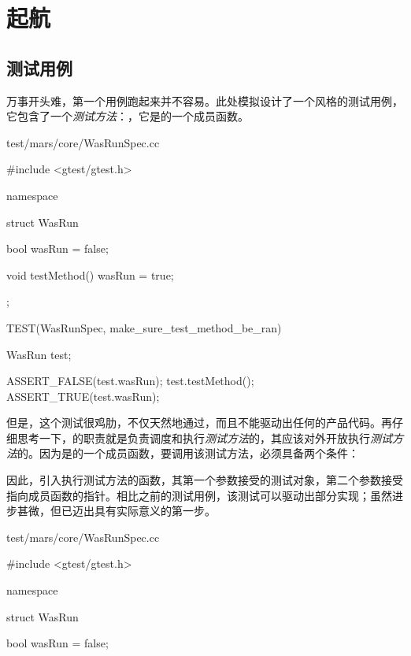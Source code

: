 \section{起航}

\begin{content}

\subsection{测试用例}

万事开头难，第一个用例跑起来并不容易。此处模拟设计了一个风格的测试用例，它包含了一个\emph{测试方法}：，它是的一个成员函数。

\begin{nodiff}{test/mars/core/WasRunSpec.cc}
\begin{c++}
#include <gtest/gtest.h>

namespace {
  struct WasRun {
    bool wasRun = false;

    void testMethod() {
      wasRun = true;
    }
  };
}

TEST(WasRunSpec, make_sure_test_method_be_ran) {
  WasRun test;

  ASSERT_FALSE(test.wasRun);
  test.testMethod();
  ASSERT_TRUE(test.wasRun);
}
\end{c++}
\end{nodiff}

但是，这个测试很鸡肋，不仅天然地通过，而且不能驱动出任何的产品代码。再仔细思考一下，的职责就是负责调度和执行\emph{测试方法}的，其应该对外开放执行\emph{测试方法}的。因为是的一个成员函数，要调用该测试方法，必须具备两个条件：

\begin{enum}
\end{enum}

因此，引入执行测试方法的函数，其第一个参数接受的测试对象，第二个参数接受指向成员函数的指针。相比之前的测试用例，该测试可以驱动出部分实现；虽然进步甚微，但已迈出具有实际意义的第一步。

\begin{diff}{test/mars/core/WasRunSpec.cc}
\begin{minicpp}
#include <gtest/gtest.h>

namespace {
  struct WasRun {
    bool wasRun = false;

}}
\end{minicpp}
\end{diff}
\end{content}
